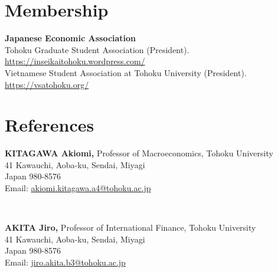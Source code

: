 \documentclass[margin,line]{res}
\begin{document}
\begin{resume}
\vspace{4mm}

\section{\sc Membership}
{\bf Japanese Economic Association} \\
Tohoku Graduate Student Association (President). \url{https://inseikaitohoku.wordpress.com/} \\
Vietnamese Student Association at Tohoku University (President). \url{https://vsatohoku.org/}

\newpage







\section{\sc References}
\vspace*{.05in}
\parbox{\textwidth}{
{\bf KITAGAWA Akiomi,} Professor of Macroeconomics, Tohoku University \\
41 Kawauchi, Aoba-ku, Sendai, Miyagi \\
Japan 980-8576 \\
Email: \href{mailto:akiomi.kitagawa.a4@tohoku.ac.jp}{akiomi.kitagawa.a4@tohoku.ac.jp}} \\

\par
\parbox{\textwidth}{
{\bf AKITA Jiro,} Professor of International Finance, Tohoku University\\
41 Kawauchi, Aoba-ku, Sendai, Miyagi \\
Japan 980-8576 \\
Email: \href{mailto:jiro.akita.b3@tohoku.ac.jp}{jiro.akita.b3@tohoku.ac.jp}}


\end{resume}
\end{document}
